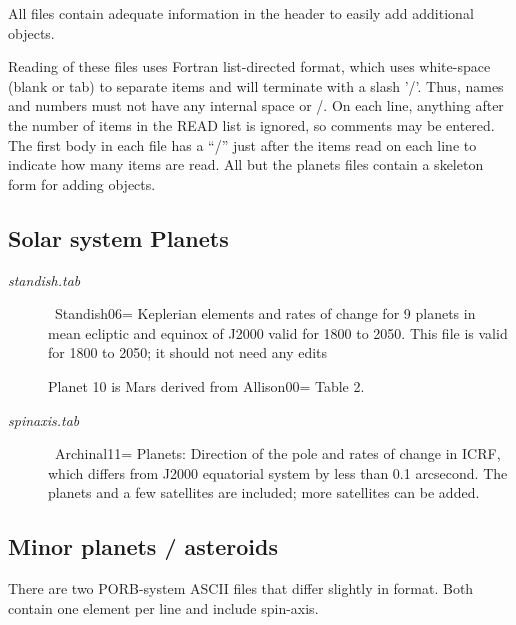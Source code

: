 \documentclass{article}
\newcommand{\qcite}[1]{#1=\cite{#1}}  %
\begin{document}
All files contain adequate information in the header to easily add additional objects.

Reading of these files uses Fortran list-directed format, which uses white-space (blank or tab)
to separate items and will terminate with a slash '/'. Thus, names and numbers
must not have any internal space or /.  On each line, anything after the number
of items in the READ list is ignored, so comments may be entered. The first body in each file has a ``/'' just after the items read on each line to indicate how many items are read. All but the planets files contain a skeleton form for adding objects.

\subsection{Solar system Planets} 

\begin{description} 
 \item [\textit{standish.tab}] \ \qcite{Standish06} Keplerian elements and rates of change for 9 planets in mean ecliptic and equinox of J2000 valid for 1800 to 2050.
This file is valid for 1800 to 2050; it should not need any edits

Planet 10 is Mars derived from \qcite{Allison00} Table 2. 

 \item [\textit{spinaxis.tab}] \ \qcite{Archinal11} Planets: Direction of the pole and rates of change in ICRF, which differs from J2000 equatorial system by less than 0.1 arcsecond. The planets and a few satellites are included; more satellites can be added.
\end{description}
\subsection{Minor planets / asteroids }

There are two PORB-system ASCII files that differ slightly in format. Both
contain one element per line and include spin-axis.
\end{document}
